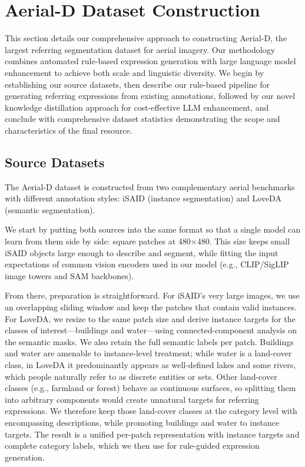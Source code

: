 
\section{Aerial-D Dataset Construction}
\label{sec:approach}

This section details our comprehensive approach to constructing Aerial-D, the largest referring segmentation dataset for aerial imagery. Our methodology combines automated rule-based expression generation with large language model enhancement to achieve both scale and linguistic diversity. We begin by establishing our source datasets, then describe our rule-based pipeline for generating referring expressions from existing annotations, followed by our novel knowledge distillation approach for cost-effective LLM enhancement, and conclude with comprehensive dataset statistics demonstrating the scope and characteristics of the final resource.

\subsection{Source Datasets}

The Aerial-D dataset is constructed from two complementary aerial benchmarks with different annotation styles: iSAID (instance segmentation) and LoveDA (semantic segmentation).

We start by putting both sources into the same format so that a single model can learn from them side by side: square patches at 480×480. This size keeps small iSAID objects large enough to describe and segment, while fitting the input expectations of common vision encoders used in our model (e.g., CLIP/SigLIP image towers and SAM backbones\cite{clip,siglip,sam}).

From there, preparation is straightforward. For iSAID’s very large images, we use an overlapping sliding window and keep the patches that contain valid instances. For LoveDA, we resize to the same patch size and derive instance targets for the classes of interest—buildings and water—using connected-component analysis on the semantic masks. We also retain the full semantic labels per patch. Buildings and water are amenable to instance-level treatment; while water is a land-cover class, in LoveDA it predominantly appears as well-defined lakes and some rivers, which people naturally refer to as discrete entities or sets. Other land-cover classes (e.g., farmland or forest) behave as continuous surfaces, so splitting them into arbitrary components would create unnatural targets for referring expressions. We therefore keep those land-cover classes at the category level with encompassing descriptions, while promoting buildings and water to instance targets. The result is a unified per-patch representation with instance targets and complete category labels, which we then use for rule-guided expression generation.

